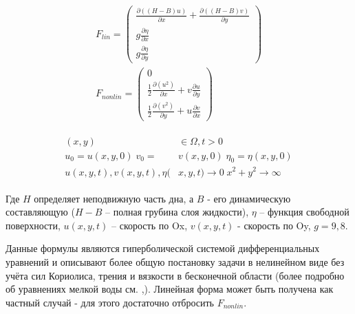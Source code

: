 \begin{gather}
    \label{eq:FLin}
    F_{lin}=\begin{pmatrix}
	\frac{\partial ((H-B)u)}{\partial x}+\frac{\partial ((H-B)v)}{\partial y}\\
	g\frac{\partial \eta}{\partial x}\\
	g\frac{\partial \eta}{\partial y}
    \end{pmatrix}\\
    \label{eq:FNonLin}
    F_{nonlin}=\begin{pmatrix}
	0\\
	\frac{1}{2}\frac{\partial (u^2)}{\partial x} + v\frac{\partial u}{\partial y}\\
	\frac{1}{2}\frac{\partial (v^2)}{\partial y} + u\frac{\partial v}{\partial x}
    \end{pmatrix}
\end{gather}

\begin{gather}
    \begin{split}
	\label{eq:BoundaryCondition}
	(x,y)&\in\Omega,t>0\\
	u_0=u(x,y,0)\;v_0=&v(x,y,0)\;\eta_0=\eta(x,y,0)\\
	u(x,y,t),v(x,y,t),\eta(&x,y,t)\to0\; x^2+y^2\to\infty
    \end{split}
\end{gather}

	Где $H$ определяет неподвижную часть дна, а $B$ - его динамическую составляющую ($H-B$ – полная грубина слоя жидкости), $\eta$ – функция свободной поверхности, $u(x,y,t)$ – скорость по Ox, $v(x,y,t)$ - скорость по Oy, $g=9,8$. 

	Данные формулы являются гиперболической системой дифференциальных уравнений и описывают более общую постановку задачи в нелинейном виде без учёта сил Кориолиса, трения и вязкости в бесконечной области (более подробно об уравнениях мелкой воды см. \cite{ovsjannikov},\cite{marchyk}). Линейная форма может быть получена как частный случай - для этого достаточно отбросить $F_{nonlin}$.